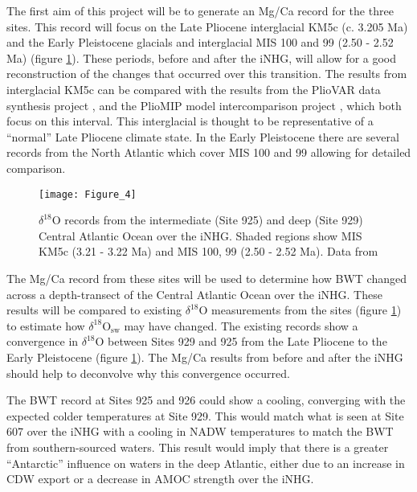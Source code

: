 The first aim of this project will be to generate an Mg/Ca record for the three sites. This record will focus on the Late Pliocene interglacial KM5c (c. 3.205 Ma) and the Early Pleistocene glacials and interglacial MIS 100 and 99 (2.50 - 2.52 Ma) (figure \ref{fig:results_04}). These periods, before and after the iNHG, will allow for a good reconstruction of the changes that occurred over this transition. The results from interglacial KM5c can be compared with the results from the PlioVAR data synthesis project \citep{mcclymontLessonsHighCO2World2020}, and the PlioMIP model intercomparison project \citep{haywoodPlioceneModelIntercomparison2020}, which both focus on this interval. This interglacial is thought to be representative of a ``normal'' Late Pliocene climate state. In the Early Pleistocene there are several records from the North Atlantic which cover MIS 100 and 99 \citep{ohnoMillennialScaleInteractionIce2016, groeneveldGlacialInducedClosure2014} allowing for detailed comparison.

\begin{figure}[h]
    \centering
    \texttt{[image: Figure\_4]}
    \caption{ $\delta^{18}\text{O}$ records from the intermediate (Site 925) and deep (Site 929) Central Atlantic Ocean over the iNHG. Shaded regions show MIS KM5c (3.21 - 3.22 Ma) and MIS 100, 99 (2.50 - 2.52 Ma). Data from \citet{wilkensRevisitingCearaRise2017}}
    \label{fig:results_04}
\end{figure}

The Mg/Ca record from these sites will be used to determine how BWT changed across a depth-transect of the Central Atlantic Ocean over the iNHG. These results will be compared to existing $\delta^{18}\text{O}$ measurements from the sites (figure \ref{fig:results_04}) \citep{wilkensRevisitingCearaRise2017} to estimate how $\delta^{18}\text{O}_\text{sw}$ may have changed. The existing records show a convergence in $\delta^{18}\text{O}$ between Sites 929 and 925 from the Late Pliocene to the Early Pleistocene (figure \ref{fig:results_04}). The Mg/Ca results from before and after the iNHG should help to deconvolve why this convergence occurred.

The BWT record at Sites 925 and 926 could show a cooling, converging with the expected colder temperatures at Site 929. This would match what is seen at Site 607 over the iNHG \citep{sosdianDeepSeaTemperatureIce2009, woodardAntarcticRoleNorthern2014} with a cooling in NADW temperatures to match the BWT from southern-sourced waters. This result would imply that there is a greater ``Antarctic'' influence on waters in the deep Atlantic, either due to an increase in CDW export or a decrease in AMOC strength over the iNHG.

